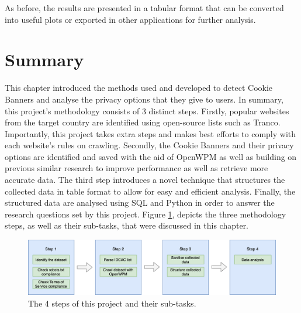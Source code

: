\documentclass[../main.tex]{subfiles}
\begin{document}
As before, the results are presented in a tabular format that can be converted into useful plots or exported in other applications for further analysis.

\section{Summary}
This chapter introduced the methods used and developed to detect Cookie Banners and analyse the privacy options that they give to users. In summary, this project’s methodology consists of 3 distinct steps. Firstly, popular websites from the target country are identified using open-source lists such as Tranco. Importantly, this project takes extra steps and makes best efforts to comply with each website's rules on crawling. Secondly, the Cookie Banners and their privacy options are identified and saved with the aid of OpenWPM as well as building on previous similar research to improve performance as well as retrieve more accurate data. The third step introduces a novel technique that structures the collected data in table format to allow for easy and efficient analysis. Finally, the structured data are analysed using SQL and Python in order to answer the research questions set by this project. Figure \ref{fig:methods_steps}, depicts the three methodology steps, as well as their sub-tasks, that were discussed in this chapter.

\begin{figure}[ht]
    \centering
    \includegraphics[width=\textwidth]{images/methodology/steps.png}
    \caption{The 4 steps of this project and their sub-tasks.}
    \label{fig:methods_steps}
\end{figure}
\end{document}
